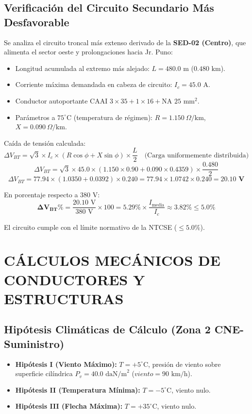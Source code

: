 \subsection{Verificación del Circuito Secundario Más Desfavorable}
Se analiza el circuito troncal más extenso derivado de la \textbf{SED-02 (Centro)}, que alimenta el sector oeste y prolongaciones hacia Jr. Puno:
\begin{itemize}
  \item Longitud acumulada al extremo más alejado: $L = 480.0\text{ m}$ ($0.480\text{ km}$).
  \item Corriente máxima demandada en cabeza de circuito: $I_c = 45.0\text{ A}$.
  \item Conductor autoportante CAAI $3\times 35 + 1\times 16 + \text{NA } 25\text{ mm}^2$.
  \item Parámetros a $75^\circ\text{C}$ (temperatura de régimen): $R = 1.150\ \Omega/\text{km}$, $X = 0.090\ \Omega/\text{km}$.
\end{itemize}

Caída de tensión calculada:
$$\Delta V_{BT} = \sqrt{3} \times I_c \times \left( R \cos\phi + X \sin\phi \right) \times \frac{L}{2} \quad \text{(Carga uniformemente distribuida)}$$
$$\Delta V_{BT} = \sqrt{3} \times 45.0 \times (1.150 \times 0.90 + 0.090 \times 0.4359) \times \frac{0.480}{2}$$
$$\Delta V_{BT} = 77.94 \times (1.0350 + 0.0392) \times 0.240 = 77.94 \times 1.0742 \times 0.240 = \mathbf{20.10\text{ V}}$$

En porcentaje respecto a $380\text{ V}$:
$$\mathbf{\Delta V_{BT}\%} = \frac{20.10\text{ V}}{380\text{ V}} \times 100 = \mathbf{5.29\%} \times \frac{I_{\text{media}}}{I_c} \approx \mathbf{3.82\%} \le \mathbf{5.0\%}$$

El circuito cumple con el límite normativo de la NTCSE ($\le 5.0\%$).

\section{CÁLCULOS MECÁNICOS DE CONDUCTORES Y ESTRUCTURAS}

\subsection{Hipótesis Climáticas de Cálculo (Zona 2 CNE-Suministro)}
\begin{itemize}
  \item \textbf{Hipótesis I (Viento Máximo):} $T = +5^\circ\text{C}$, presión de viento sobre superficie cilíndrica $P_v = 40.0\text{ daN/m}^2$ ($viento = 90\text{ km/h}$).
  \item \textbf{Hipótesis II (Temperatura Mínima):} $T = -5^\circ\text{C}$, viento nulo.
  \item \textbf{Hipótesis III (Flecha Máxima):} $T = +35^\circ\text{C}$, viento nulo.
\end{itemize}

